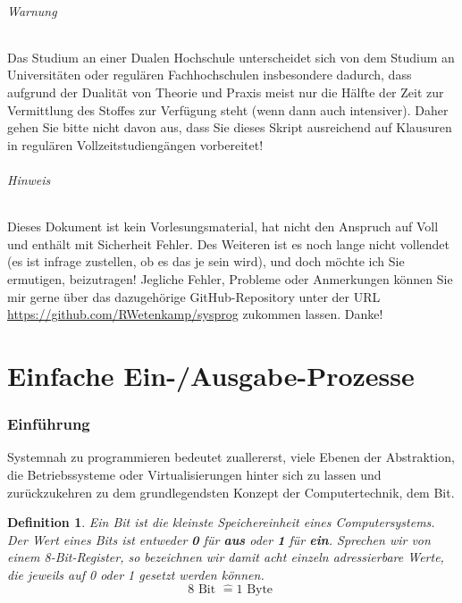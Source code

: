 \documentclass[11pt,a4paper]{scrartcl}
\newtheorem{definition}{Definition}
\begin{document}
\paragraph{Warnung}
Das Studium an einer Dualen Hochschule unterscheidet sich von dem Studium an Universitäten oder regulären Fachhochschulen insbesondere dadurch, dass aufgrund der Dualität von Theorie und Praxis meist nur die Hälfte der Zeit zur Vermittlung des Stoffes zur Verfügung steht (wenn dann auch intensiver). Daher gehen Sie bitte nicht davon aus, dass Sie dieses Skript ausreichend auf Klausuren in regulären Vollzeitstudiengängen vorbereitet!
\paragraph{Hinweis}
Dieses Dokument ist kein Vorlesungsmaterial, hat nicht den Anspruch auf {Voll} und enthält mit Sicherheit Fehler. Des Weiteren ist es noch lange nicht vollendet (es ist infrage zustellen, ob es das je sein wird), und doch möchte ich Sie ermutigen, beizutragen! Jegliche Fehler, Probleme oder Anmerkungen können Sie mir gerne über das dazugehörige GitHub-Repository unter der URL \url{https://github.com/RWetenkamp/sysprog} zukommen lassen. Danke!
\pagebreak
\part{Einfache Ein-/Ausgabe-Prozesse}
\section{Einführung}
Systemnah zu programmieren bedeutet zuallererst, viele Ebenen der Abstraktion, die Betriebssysteme oder Virtualisierungen hinter sich zu lassen und zurückzukehren zu dem grundlegendsten Konzept der Computertechnik, dem Bit. \\
\begin{definition}
Ein Bit ist die kleinste Speichereinheit eines Computersystems. Der Wert eines Bits ist entweder \textbf{0} für \textbf{aus} oder \textbf{1} für \textbf{ein}. Sprechen wir von einem 8-Bit-Register, so bezeichnen wir damit acht einzeln adressierbare Werte, die jeweils auf 0 oder 1 gesetzt werden können. 
\[8 \text{ Bit } \widehat{=} 1 \text{ Byte }\]
\end{definition}
\end{document}
